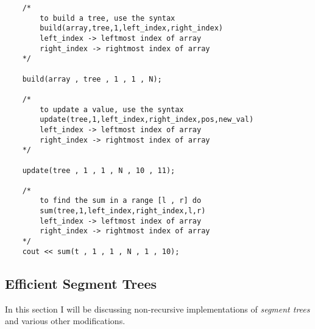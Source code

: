 \documentclass[12pt,a4paper]{amsart}
\numberwithin{equation}{section}
\theoremstyle{definition}
\begin{document}
\begin{lstlisting}
    /*
        to build a tree, use the syntax
        build(array,tree,1,left_index,right_index)
        left_index -> leftmost index of array
        right_index -> rightmost index of array
    */
    
    build(array , tree , 1 , 1 , N);

    /*
        to update a value, use the syntax
        update(tree,1,left_index,right_index,pos,new_val)
        left_index -> leftmost index of array
        right_index -> rightmost index of array
    */
    
    update(tree , 1 , 1 , N , 10 , 11);

    /*
        to find the sum in a range [l , r] do
        sum(tree,1,left_index,right_index,l,r)
        left_index -> leftmost index of array
        right_index -> rightmost index of array
    */
    cout << sum(t , 1 , 1 , N , 1 , 10);
\end{lstlisting}

\subsection{Efficient Segment Trees} In this section I will be discussing non-recursive implementations of \textit{segment trees} and various other modifications. 
\end{document}
